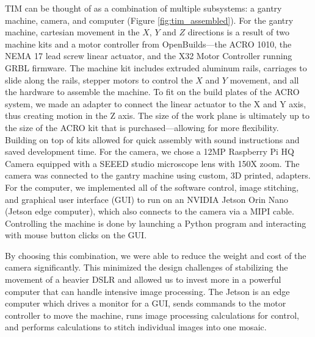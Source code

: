 \documentclass[a4paper,12pt]{article}
\begin{document}
TIM can be thought of as a combination of multiple subsystems: a gantry machine, camera, and computer (Figure \ref{fig:tim_assembled}). 
For the gantry machine, cartesian movement in the $X$, $Y$ and $Z$ directions is a result of two machine kits and a motor controller from OpenBuilds---the ACRO 1010, the NEMA 17 lead screw linear actuator, and the X32 Motor Controller running GRBL firmware. %
The machine kit includes extruded aluminum rails, carriages to slide along the rails, stepper motors to control the $X$ and $Y$ movement, and all the hardware to assemble the machine. 
To fit on the build plates of the ACRO system, we made an adapter to connect the linear actuator to the X and Y axis, thus creating motion in the Z axis.
The size of the work plane is ultimately up to the size of the ACRO kit that is purchased---allowing for more flexibility.
Building on top of kits allowed for quick assembly with sound instructions and saved development time. 
For the camera, we chose a 12MP Raspberry Pi HQ Camera equipped with a SEEED studio microscope lens with 150X zoom. The camera was connected to the gantry machine using custom, 3D printed, adapters.
For the computer, we implemented all of the software control, image stitching, and graphical user interface (GUI) to run on an NVIDIA Jetson Orin Nano (Jetson edge computer), which also connects to the camera via a MIPI cable. 
Controlling the machine is done by launching a Python program and interacting with mouse button clicks on the GUI. 

By choosing this combination, we were able to reduce the weight and cost of the camera significantly. This minimized the design challenges of stabilizing the movement of a heavier DSLR and allowed us to invest more in a powerful computer that can handle intensive image processing. 
The Jetson is an edge computer which drives a monitor for a GUI, sends commands to the motor controller to move the machine, runs image processing calculations for control, and performs calculations to stitch individual images into one mosaic. 
\end{document}
